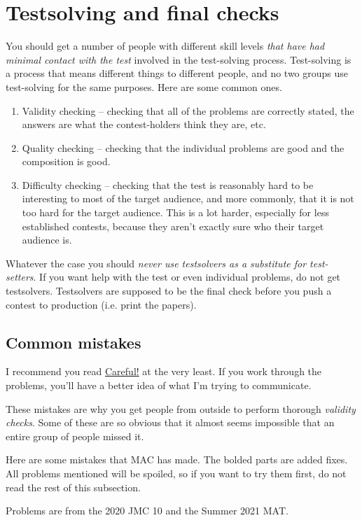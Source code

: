 \documentclass[points=false]{bounce}
\begin{document}
\section{Testsolving and final checks}

You should get a number of people with different skill levels \emph{that have had minimal contact with the test} involved in the test-solving process. Test-solving is a process that means different things to different people, and no two groups use test-solving for the same purposes. Here are some common ones.
\begin{enumerate}
    \item Validity checking -- checking that all of the problems are correctly stated, the answers are what the contest-holders think they are, etc.
    \item Quality checking -- checking that the individual problems are good and the composition is good.
    \item Difficulty checking -- checking that the test is reasonably hard to be interesting to most of the target audience, and more commonly, that it is not too hard for the target audience. This is a lot harder, especially for less established contests, because they aren't exactly sure who their target audience is. 
\end{enumerate}
Whatever the case you should \emph{never use testsolvers as a substitute for test-setters}. If you want help with the test or even individual problems, do not get testsolvers. Testsolvers are supposed to be the final check before you push a contest to production (i.e. print the papers).

\subsection{Common mistakes}
I recommend you read \href{https://www.dennisc.net/resources/careful.pdf}{Careful!} at the very least. If you work through the problems, you'll have a better idea of what I'm trying to communicate.

These mistakes are why you get people from outside to perform thorough \emph{validity checks}. Some of these are so obvious that it almost seems impossible that an entire group of people missed it.

Here are some mistakes that MAC has made. The bolded parts are added fixes. All problems mentioned will be spoiled, so if you want to try them first, do not read the rest of this subsection.

Problems are from the 2020 JMC 10 and the Summer 2021 MAT.
\end{document}
